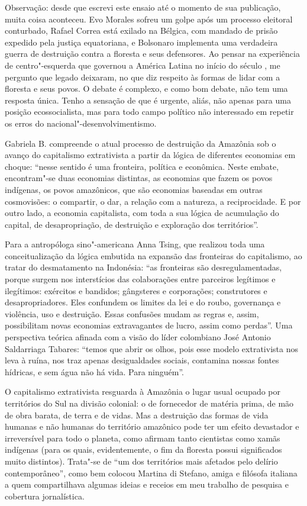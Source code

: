 Observação: desde que escrevi este ensaio até o momento de sua publicação, muita coisa aconteceu. Evo Morales sofreu um golpe após um processo eleitoral conturbado, Rafael Correa está exilado na Bélgica, com mandado de prisão expedido pela justiça equatoriana, e Bolsonaro implementa uma verdadeira guerra de destruição contra a floresta e seus defensores. Ao pensar na experiência de centro"-esquerda que governou a América Latina no início do século , me pergunto que legado deixaram, no que diz respeito às formas de lidar com a floresta e seus povos. O debate é complexo, e como bom debate, não tem uma resposta única. Tenho a sensação de que é urgente, aliás, não apenas para uma posição ecossocialista, mas para todo campo político não interessado em repetir os erros do nacional"-desenvolvimentismo.

\asterisc

Gabriela B. compreende o atual processo de destruição da Amazônia sob o
avanço do capitalismo extrativista a partir da lógica de diferentes
economias em choque: ``nesse sentido é uma fronteira, política e
econômica. Neste embate, encontram"-se duas economias distintas, as
economias que fazem os povos indígenas, os povos amazônicos, que são
economias baseadas em outras cosmovisões: o compartir, o dar, a relação
com a natureza, a reciprocidade. E por outro lado, a economia
capitalista, com toda a sua lógica de acumulação do capital, de
desapropriação, de destruição e exploração dos territórios''.

Para a antropóloga sino"-americana Anna Tsing, que realizou toda uma
conceitualização da lógica embutida na expansão das fronteiras do
capitalismo, ao tratar do desmatamento na Indonésia: ``as fronteiras são desregulamentadas, porque surgem nos interstícios das colaborações entre parceiros legítimos e ilegítimos: exércitos e bandidos; gângsteres e corporações; construtores e desapropriadores. Eles confundem os limites da lei e do roubo, governança e  violência, uso e destruição. Essas confusões mudam as regras e, assim, possibilitam novas economias extravagantes de lucro, assim como perdas''.
Uma perspectiva
teórica afinada com a visão do líder colombiano José Antonio Saldarriaga
Tabares: ``temos que abrir os olhos, pois esse modelo extrativista nos
leva à ruína, nos traz apenas desigualdades sociais, contamina nossas
fontes hídricas, e sem água não há vida. Para ninguém''.

O capitalismo extrativista resguarda à Amazônia o lugar usual ocupado
por territórios do Sul na divisão colonial: o de fornecedor de matéria
prima, de mão de obra barata, de terra e de vidas. Mas a destruição das
formas de vida humanas e não humanas do território amazônico pode ter um
efeito devastador e irreversível para todo o planeta, como afirmam tanto
cientistas como xamãs indígenas (para os quais, evidentemente, o fim
da floresta possui significados muito distintos). Trata"-se de ``um dos
territórios mais afetados pelo delírio contemporâneo'', como bem colocou
Martina di Stefano, amiga e filósofa italiana a quem compartilhava algumas ideias e
receios em meu trabalho de pesquisa e cobertura jornalística.

